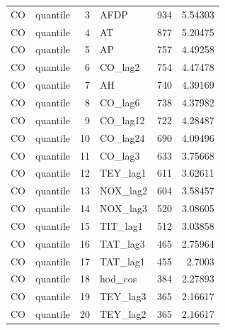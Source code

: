 \begin{tabular}{llrlrr}
CO & quantile & 3 & AFDP & 934 & 5.54303 \\
CO & quantile & 4 & AT & 877 & 5.20475 \\
CO & quantile & 5 & AP & 757 & 4.49258 \\
CO & quantile & 6 & CO\_lag2 & 754 & 4.47478 \\
CO & quantile & 7 & AH & 740 & 4.39169 \\
CO & quantile & 8 & CO\_lag6 & 738 & 4.37982 \\
CO & quantile & 9 & CO\_lag12 & 722 & 4.28487 \\
CO & quantile & 10 & CO\_lag24 & 690 & 4.09496 \\
CO & quantile & 11 & CO\_lag3 & 633 & 3.75668 \\
CO & quantile & 12 & TEY\_lag1 & 611 & 3.62611 \\
CO & quantile & 13 & NOX\_lag2 & 604 & 3.58457 \\
CO & quantile & 14 & NOX\_lag3 & 520 & 3.08605 \\
CO & quantile & 15 & TIT\_lag1 & 512 & 3.03858 \\
CO & quantile & 16 & TAT\_lag3 & 465 & 2.75964 \\
CO & quantile & 17 & TAT\_lag1 & 455 & 2.7003 \\
CO & quantile & 18 & hod\_cos & 384 & 2.27893 \\
CO & quantile & 19 & TEY\_lag3 & 365 & 2.16617 \\
CO & quantile & 20 & TEY\_lag2 & 365 & 2.16617 \\
\bottomrule
\end{tabular}
